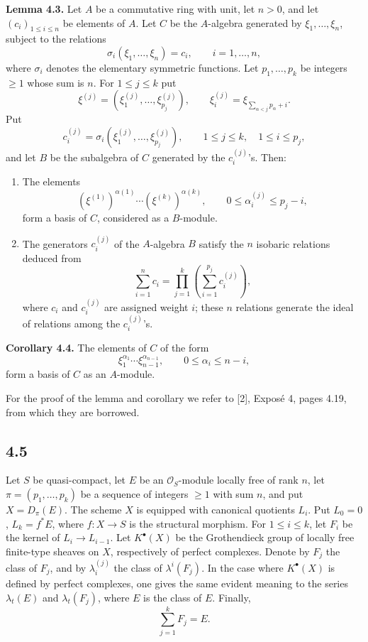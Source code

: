 \textbf{Lemma 4.3.} Let \(A\) be a commutative ring with unit, let \(n>0\), and let \((c_i)_{1\leq i\leq n}\) be elements of \(A\). Let \(C\) be the \(A\)-algebra generated by \(\xi_1,\ldots,\xi_n\), subject to the relations
\[
  \sigma_i(\xi_1,\ldots,\xi_n)=c_i,
  \qquad i=1,\ldots,n,
\]
where \(\sigma_i\) denotes the elementary symmetric functions. Let \(p_1,\ldots,p_k\) be integers \(\geq 1\) whose sum is \(n\). For \(1\leq j\leq k\) put
\[
  \xi^{(j)}=(\xi^{(j)}_1,\ldots,\xi^{(j)}_{p_j}),
  \qquad
  \xi_i^{(j)}=\xi_{\sum_{\alpha<j}p_\alpha+i}.
\]
Put
\[
  c_i^{(j)}=\sigma_i(\xi^{(j)}_1,\ldots,\xi^{(j)}_{p_j}),
  \qquad 1\leq j\leq k,
  \quad 1\leq i\leq p_j,
\]
and let \(B\) be the subalgebra of \(C\) generated by the \(c_i^{(j)}\)'s. Then:

\begin{enumerate}[label=\textup{\roman*)}]
\item The elements
\[
  (\xi^{(1)})^{\alpha(1)}\cdots(\xi^{(k)})^{\alpha(k)},
  \qquad 0\leq \alpha_i^{(j)}\leq p_j-i,
\]
form a basis of \(C\), considered as a \(B\)-module.
\item The generators \(c_i^{(j)}\) of the \(A\)-algebra \(B\) satisfy the \(n\) isobaric relations deduced from
\[
  \sum_{i=1}^n c_i
  =
  \prod_{j=1}^{k}\left(\sum_{i=1}^{p_j} c_i^{(j)}\right),
\]
where \(c_i\) and \(c_i^{(j)}\) are assigned weight \(i\); these \(n\) relations generate the ideal of relations among the \(c_i^{(j)}\)'s.
\end{enumerate}

\textbf{Corollary 4.4.} The elements of \(C\) of the form
\[
  \xi_1^{\alpha_1}\cdots \xi_{n-1}^{\alpha_{n-1}},
  \qquad 0\leq \alpha_i\leq n-i,
\]
form a basis of \(C\) as an \(A\)-module.

For the proof of the lemma and corollary we refer to [2], Exposé 4, pages 4.19, from which they are borrowed.

\subsection*{4.5}
Let \(S\) be quasi-compact, let \(E\) be an \(\mathcal O_S\)-module locally free of rank \(n\), let \(\pi=(p_1,\ldots,p_k)\) be a sequence of integers \(\geq 1\) with sum \(n\), and put \(X=D_\pi(E)\). The scheme \(X\) is equipped with canonical quotients \(L_i\). Put \(L_0=0\), \(L_k=f^*E\), where \(f:X\to S\) is the structural morphism. For \(1\leq i\leq k\), let \(F_i\) be the kernel of \(L_i\to L_{i-1}\). Let \(K^\bullet(X)\) be the Grothendieck group of locally free finite-type sheaves on \(X\), respectively of perfect complexes. Denote by \(F_j\) the class of \(F_j\), and by \(\lambda_i^{(j)}\) the class of \(\lambda^i(F_j)\). In the case where \(K^\bullet(X)\) is defined by perfect complexes, one gives the same evident meaning to the series \(\lambda_t(E)\) and \(\lambda_t(F_j)\), where \(E\) is the class of \(E\). Finally,
\[
  \sum_{j=1}^{k}F_j=E.
\]

